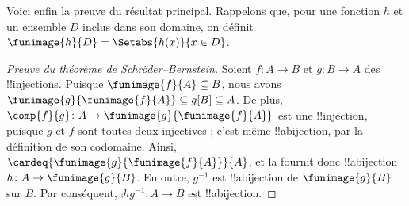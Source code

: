 \documentclass[../../../include/open-logic-section]{subfiles}
\begin{document}
Voici enfin la preuve du résultat principal. Rappelons que, pour une
fonction $h$ et un ensemble $D$ inclus dans son domaine, on définit
$\funimage{h}{D}=\Setabs{h(x)}{x\in D}$.

\begin{proof}[Preuve du théorème de Schröder--Bernstein]
Soient $f\colon A\to B$ et $g\colon B\to A$ des !!{injection}s.
Puisque $\funimage{f}{A}\subseteq B$, nous avons
$\funimage{g}{\funimage{f}{A}}\subseteq g[B]\subseteq A$.
De plus, $\comp{f}{g}\colon A\to\funimage{g}{\funimage{f}{A}}$
est une !!{injection}, puisque $g$ et $f$ sont toutes deux injectives ;
c'est même !!a{bijection}, par la définition de son codomaine.
Ainsi, $\cardeq{\funimage{g}{\funimage{f}{A}}}{A}$, et la
 fournit donc !!a{bijection}
$h\colon A\to\funimage{g}{B}$. En outre, $g^{-1}$ est !!a{bijection}
de $\funimage{g}{B}$ sur $B$. Par conséquent,
$\comp{h}{g^{-1}}\colon A\to B$ est !!a{bijection}.
\end{proof}
\end{document}
